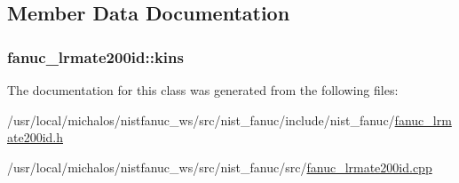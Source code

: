 \subsection{Member Data Documentation}
\hypertarget{classfanuc__lrmate200id_afd60b9cabb3a40051d9370f3e4d1bf9a}{
\subsubsection[{kins}]{ fanuc\-\_\-lrmate200id\-::kins}}\label{classfanuc__lrmate200id_afd60b9cabb3a40051d9370f3e4d1bf9a}


The documentation for this class was generated from the following files\-:\begin{DoxyCompactItemize}
\item 
/usr/local/michalos/nistfanuc\-\_\-ws/src/nist\-\_\-fanuc/include/nist\-\_\-fanuc/\hyperlink{fanuc__lrmate200id_8h}{fanuc\-\_\-lrmate200id.\-h}\item 
/usr/local/michalos/nistfanuc\-\_\-ws/src/nist\-\_\-fanuc/src/\hyperlink{fanuc__lrmate200id_8cpp}{fanuc\-\_\-lrmate200id.\-cpp}\end{DoxyCompactItemize}
